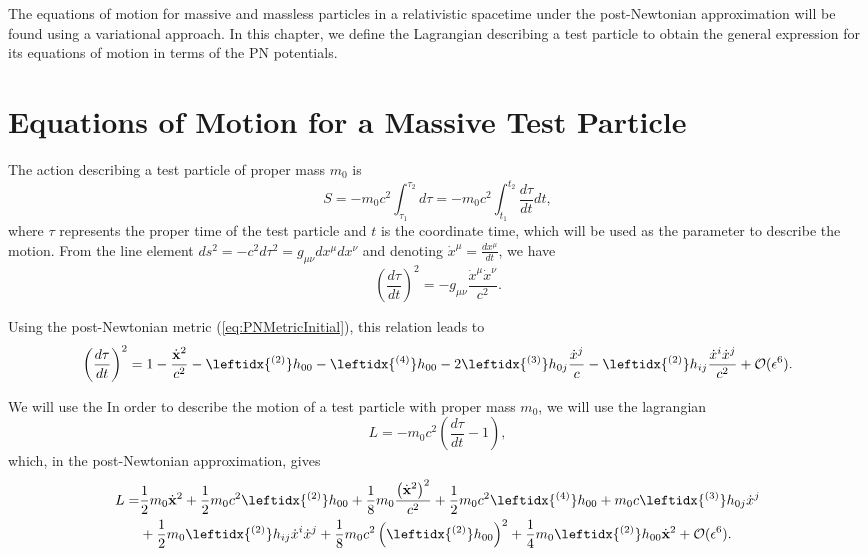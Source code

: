 The equations of motion for massive and massless particles in a relativistic spacetime under the post-Newtonian approximation will be found using a variational approach. In this chapter, we define the Lagrangian describing a test particle to obtain the general expression for its equations of motion in terms of the PN potentials.

\section{Equations of Motion for a Massive Test Particle}
The action describing a test particle of proper mass $m_0$ is
\begin{equation}
S = -m_0 c^2 \int_{\tau_1} ^{\tau_2} d\tau = -m_0 c^2 \int_{t_1} ^{t_2}  \frac{d\tau}{dt} dt ,
\end{equation}
where $\tau$ represents the proper time of the test particle and $t$ is the coordinate time, which will be used as the parameter to describe the motion. From the line element $ds^2 = - c^2 d\tau^2 = g_{\mu \nu} dx^\mu dx^\nu$ and denoting $\dot{x}^\mu = \frac{dx^\mu }{dt}$, we have
\begin{equation}
\left( \frac{d\tau}{dt} \right)^2 = - g_{\mu \nu} \frac{\dot{x}^\mu \dot{x}^\nu}{c^2}.
\end{equation}

Using the post-Newtonian metric (\ref{eq:PNMetricInitial}), this relation leads to  
\begin{equation}
\left( \frac{d\tau}{dt} \right)^2 = 1 - \frac{\dot{\textbf{x}}^2}{c^2}  - \leftidx{^{(2)}}h_{00} - \leftidx{^{(4)}}h_{00} - 2 \leftidx{^{(3)}}h_{0j} \frac{\dot{x}^j}{c} - \leftidx{^{(2)}}h_{ij} \frac{\dot{x}^i \dot{x}^j}{c^2} + \mathcal{O} ( \epsilon^6 ).  
\end{equation}

We will use the In order to describe the motion of a test particle with proper mass $m_0$, we will use the lagrangian 
\begin{equation}
L=-m_0 c^2 \left( \frac{d\tau}{dt} - 1\right), \label{eq:PNLagrangianDefinition}
\end{equation}
which, in the post-Newtonian approximation, gives
\begin{align}
L = &\frac{1}{2} m_0 \dot{\textbf{x}} ^2 + \frac{1}{2} m_0 c^2 \leftidx{^{(2)}}h_{00} + \frac{1}{8} m_0 \frac{\left( \dot{\textbf{x}} ^2 \right)^2}{c^2}  + \frac{1}{2} m_0 c^2 \leftidx{^{(4)}}h_{00} + m_0 c \leftidx{^{(3)}}h_{0j} \dot{x}^j  \notag \\
&+ \frac{1}{2} m_0 \leftidx{^{(2)}}h_{ij} \dot{x}^i \dot{x}^j + \frac{1}{8} m_0 c^2 \left( \leftidx{^{(2)}}h_{00} \right)^2 + \frac{1}{4} m_0 \leftidx{^{(2)}}h_{00} \dot{\textbf{x}} ^2 + \mathcal{O} ( \epsilon^6 )  \label{eq:LagrangianMassiveParticle}.
\end{align}

